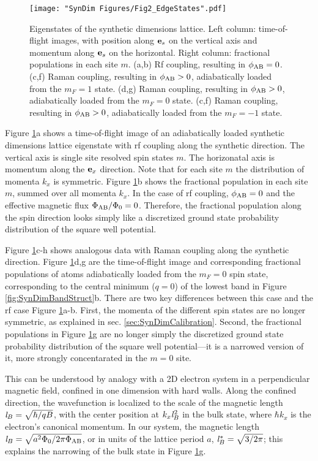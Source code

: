 \begin{figure}
	\texttt{[image: "SynDim Figures/Fig2\_EdgeStates".pdf]}
\caption[Eigenstates of the synthetic dimensions lattice]{Eigenstates of the synthetic dimensions lattice. Left column: time-of-flight images, with position along ${\bf e}_s$ on the vertical axis and momentum along ${\bf e}_s$ on the horizontal. Right column: fractional populations in each site $m$.  (a,b) Rf coupling, resulting in $\phi_{\rm AB}=0$. (c,f) Raman coupling, resulting in $\phi_{\rm AB}>0$, adiabatically loaded from the $m_F=1$ state.  (d,g) Raman coupling, resulting in $\phi_{\rm AB}>0$, adiabatically loaded from the $m_F=0$ state. (c,f) Raman coupling, resulting in $\phi_{\rm AB}>0$, adiabatically loaded from the $m_F=-1$ state.}
\label{fig:TOFeigenstates}
\end{figure}

Figure \ref{fig:TOFeigenstates}a shows a time-of-flight image of an adiabatically loaded synthetic dimensions lattice eigenstate with rf coupling along the synthetic direction. The vertical axis is single site resolved spin states $m$. The horizonatal axis is momentum along the ${\bf e}_x$ direction. Note that for each site $m$ the distribution of momenta $k_x$ is symmetric. Figure \ref{fig:TOFeigenstates}b shows the fractional population in each site $m$, summed over all momenta $k_x$.  In the case of rf coupling, $\phi_{\rm AB}=0$ and the effective magnetic flux $\Phi_{\rm AB}/\Phi_0=0$.  Therefore, the fractional population along the spin direction looks simply like a discretized ground state probability distribution of the square well potential.

Figure \ref{fig:TOFeigenstates}c-h shows analogous data with Raman coupling along the synthetic direction. Figure \ref{fig:TOFeigenstates}d,g are the time-of-flight image and corresponding fractional populations of atoms adiabatically loaded from the $m_F=0$ spin state, corresponding to the central minimum ($q=0$) of the lowest band in Figure \ref{fig:SynDimBandStruct}b. There are two key differences between this case and the rf case Figure \ref{fig:TOFeigenstates}a-b. First, the momenta of the different spin states are no longer symmetric, as explained in sec. \ref{sec:SynDimCalibration}. Second, the fractional populations in Figure \ref{fig:TOFeigenstates}g are no longer simply the discretized ground state probability distribution of the square well potential---it is a narrowed version of it, more strongly concentarated in the $m=0$ site. 

This can be understood by analogy with a 2D electron system in a perpendicular magnetic field, confined in one dimension with hard walls. Along the confined direction, the wavefunction is localized to the scale of the magnetic length ${\it l}_B=\sqrt{\hbar/qB}$, with the center position at $k_x {\it l}_B^2$ in the bulk state, where $\hbar k_x$ is the electron’s canonical momentum. In our system, the magnetic length${\it l}_B=\sqrt{a^2 \Phi_0/2\pi\Phi_{\rm AB}}$, or in units of the lattice period $a$, ${\it l}^*_B=\sqrt{3/2\pi}$; this explains the narrowing of the bulk state in Figure \ref{fig:TOFeigenstates}g.


